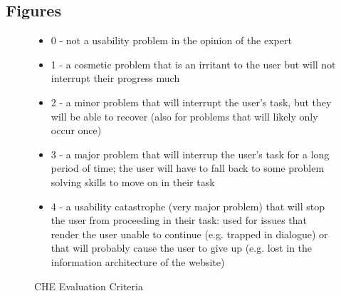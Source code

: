 \begin{appendices}
  \section{Figures}
  \begin{center}
    \begin{figure}[htbp]
      \begin{itemize}
      \item 0 - not a usability problem in the opinion of the expert
      \item 1 - a cosmetic problem that is an irritant to the user but will not interrupt their progress much
      \item 2 - a minor problem that will interrupt the user's task, but they will be able to recover (also for problems that will likely only occur once)
      \item 3 - a major problem that will interrup the user's task for a long period of time; the user will have to fall back to some problem solving skills to move on in their task
      \item 4 - a usability catastrophe (very major problem) that will stop the user from proceeding in their task: used for issues that render the user unable to continue (e.g. trapped in dialogue) or that will probably cause the user to give up (e.g. lost in the information architecture of the website)
      \end{itemize}
      \caption{CHE Evaluation Criteria}
      \label{fig1}
    \end{figure}
  \end{center}
\end{appendices}